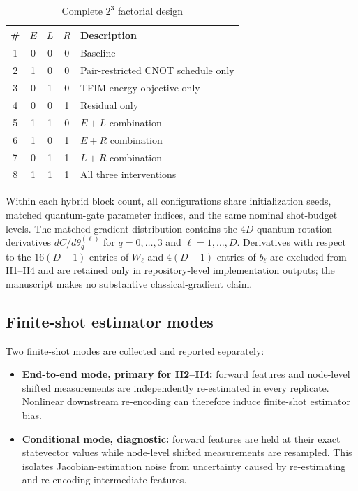 \documentclass[pdflatex,sn-mathphys-num,Numbered]{sn-jnl}
\begin{document}
\begin{table}[t]
\centering
\begin{tabular}{cccc l}
\toprule
\# & $E$ & $L$ & $R$ & Description \\
\midrule
1 & 0 & 0 & 0 & Baseline \\
2 & 1 & 0 & 0 & Pair-restricted CNOT schedule only \\
3 & 0 & 1 & 0 & TFIM-energy objective only \\
4 & 0 & 0 & 1 & Residual only \\
5 & 1 & 1 & 0 & $E+L$ combination \\
6 & 1 & 0 & 1 & $E+R$ combination \\
7 & 0 & 1 & 1 & $L+R$ combination \\
8 & 1 & 1 & 1 & All three interventions \\
\bottomrule
\end{tabular}
\caption{Complete $2^3$ factorial design}
\label{tab:configurations}
\end{table}

Within each hybrid block count, all configurations share initialization seeds, matched quantum-gate parameter indices, and the same nominal shot-budget levels. The matched gradient distribution contains the $4D$ quantum rotation derivatives $dC/d\theta_q^{(\ell)}$ for $q=0,\ldots,3$ and $\ell=1,\ldots,D$. Derivatives with respect to the $16(D-1)$ entries of $W_\ell$ and $4(D-1)$ entries of $b_\ell$ are excluded from H1--H4 and are retained only in repository-level implementation outputs; the manuscript makes no substantive classical-gradient claim.

\subsection{Finite-shot estimator modes}

Two finite-shot modes are collected and reported separately:

\begin{itemize}
\item \textbf{End-to-end mode, primary for H2--H4:} forward features and node-level shifted measurements are independently re-estimated in every replicate. Nonlinear downstream re-encoding can therefore induce finite-shot estimator bias.
\item \textbf{Conditional mode, diagnostic:} forward features are held at their exact statevector values while node-level shifted measurements are resampled. This isolates Jacobian-estimation noise from uncertainty caused by re-estimating and re-encoding intermediate features.
\end{itemize}
\end{document}

